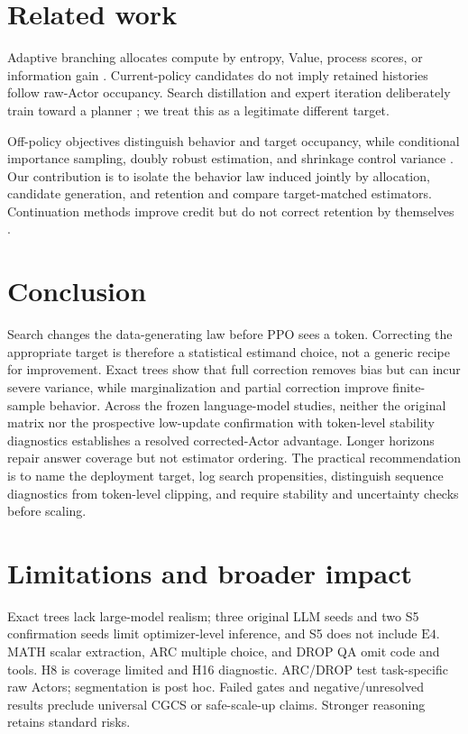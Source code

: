 \documentclass[10pt]{article}
\newcommand{\method}{\textsc{CGCS}}
\newcommand{\Efour}{\ensuremath{\mathrm{E4}}}
\begin{document}
\section{Related work}
Adaptive branching allocates compute by entropy, Value, process scores, or
information gain \citep{he2026bpo,xing2025latr,khomich2026epigtree,li2026patr}.
Current-policy candidates do not imply retained histories follow raw-Actor
occupancy. Search distillation and expert iteration deliberately train toward a
planner \citep{djuhera2026tsr,feng2023tsllm,zhang2024restmcts,anthony2017expert,silver2017alphazero};
we treat this as a legitimate different target.

Off-policy objectives distinguish behavior and target occupancy, while
conditional importance sampling, doubly robust estimation, and shrinkage
control variance \citep{degris2012offpolicy,imani2018emphatic,liu2020conditional,jiang2016doubly,kallus2020double,munos2016retrace,espeholt2018impala}.
Our contribution is to isolate the behavior law induced jointly by allocation,
candidate generation, and retention and compare target-matched estimators.
Continuation methods improve credit but do not correct retention by themselves
\citep{kazemnejad2024vineppo,he2025trepo}.

\section{Conclusion}
Search changes the data-generating law before PPO sees a token.  Correcting the
appropriate target is therefore a statistical estimand choice, not a generic
recipe for improvement.  Exact trees show that full correction removes bias but
can incur severe variance, while marginalization and partial correction improve
finite-sample behavior.  Across the frozen language-model studies, neither the
original matrix nor the prospective low-update confirmation with token-level
stability diagnostics establishes a
resolved corrected-Actor advantage.  Longer horizons repair answer coverage but
not estimator ordering.  The practical recommendation is to name the
deployment target, log search propensities, distinguish sequence diagnostics
from token-level clipping, and require stability and uncertainty checks before
scaling.

\section{Limitations and broader impact}
Exact trees lack large-model realism; three original LLM seeds and two S5
confirmation seeds limit optimizer-level inference, and S5 does not include \Efour{}. MATH scalar extraction,
ARC multiple choice, and DROP QA omit code and tools. H8 is coverage limited
and H16 diagnostic. ARC/DROP test task-specific raw Actors; segmentation is
post hoc. Failed gates and negative/unresolved results preclude universal
\method{} or safe-scale-up claims. Stronger reasoning retains standard risks.
\end{document}
